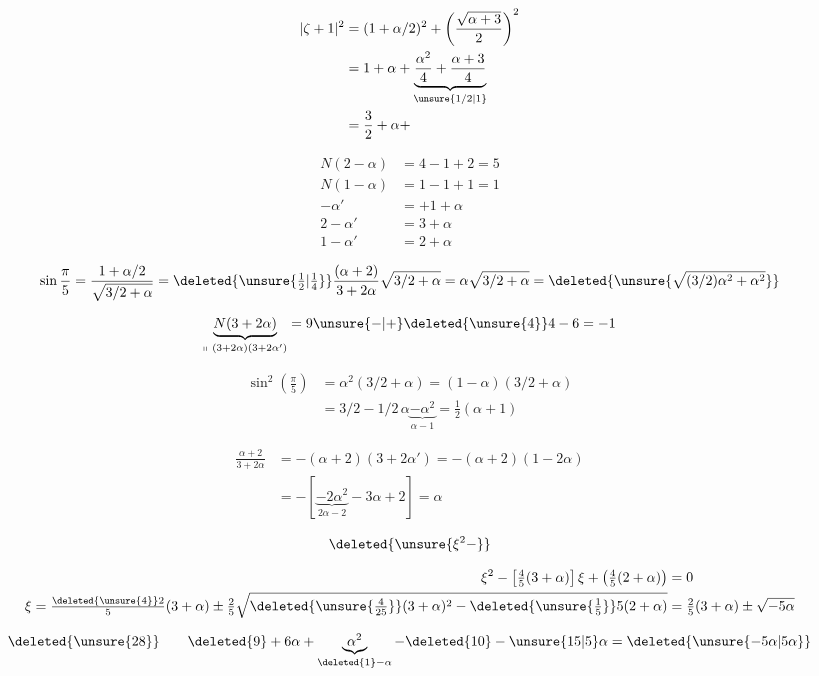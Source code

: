 \[
\begin{aligned}
 |\zeta+1|^2&=(1+\alpha/2)^2+\left(\frac{\sqrt{\alpha+3}}2\right)^2\\
 &=1+\alpha+\underbrace{\frac{\alpha^2}4+\frac{\alpha+3}4}_{\unsure{1/2|1}}\\
 &=\frac32+\alpha+
\end{aligned}
\]

\[
\begin{aligned}
N(2-\alpha)&=4-1+2=5\\
N(1-\alpha)&=1-1+1=1\\
-\alpha'&=+1+\alpha\\
2-\alpha'&=3+\alpha\\
1-\alpha'&=2+\alpha
\end{aligned}
\]

\[
 \sin\frac{\pi}{5}=\frac{1+\alpha/2}{\sqrt{3/2+\alpha}}
 =\deleted{\unsure{\tfrac12|\tfrac14}}\frac{(\alpha+2)}{3+2\alpha}\sqrt{3/2+\alpha}
 =\alpha\sqrt{3/2+\alpha}=\deleted{\unsure{\sqrt{(3/2)\alpha^2+\alpha^2}}}
\]

\[
 \underbrace{N(3+2\alpha)}_{\shortparallel\ (3+2\alpha)(3+2\alpha')}=9\unsure{-|+}\deleted{\unsure{4}}4-6=-1
\]

\[
\begin{aligned}
 \sin^2\left(\frac{\pi}{5}\right)&=\alpha^2(3/2+\alpha)=(1-\alpha)(3/2+\alpha)\\
 &=3/2-1/2\,\alpha\underbrace{-\alpha^2}_{\alpha-1}=\tfrac12(\alpha+1)
\end{aligned}
\]

\[
\begin{aligned}
 \frac{\alpha+2}{3+2\alpha}&=-(\alpha+2)(3+2\alpha')=-(\alpha+2)(1-2\alpha)\\
 &=-[\underbrace{-2\alpha^2}_{2\alpha-2}-3\alpha+2]=\alpha
\end{aligned}
\]

\[
 \deleted{\unsure{\xi^2-}}
\]

\[
\begin{aligned}
 \xi^2-\left[\tfrac45(3+\alpha)\right]\xi+\left(\tfrac45(2+\alpha)\right)&=0\\
 \xi=\tfrac{\deleted{\unsure{4}}2}{5}(3+\alpha)
 \mathbin{\pm}\tfrac25\sqrt{\deleted{\unsure{\tfrac4{25}}}(3+\alpha)^2-
 \deleted{\unsure{\tfrac15}}5(2+\alpha)}
 &=\tfrac25(3+\alpha)\mathbin{\pm}\sqrt{-5\alpha}
\end{aligned}
\]

\[
 \deleted{\unsure{28}}\qquad
 \deleted{9}+6\alpha+\underbrace{\alpha^2}_{\deleted{1}-\alpha}-\deleted{10}
 -\unsure{15|5}\alpha=\deleted{\unsure{-5\alpha|5\alpha}}
\]
